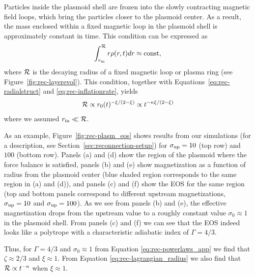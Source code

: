 Particles inside the plasmoid shell are frozen into the slowly contracting magnetic field loops, which bring the particles closer to the plasmoid center. As a result, the mass enclosed within a fixed magnetic loop in the plasmoid shell is approximately constant in time. This condition can be expressed as
\begin{equation}
    \int_{r_{\rm in}}^{\mathcal{R}}r \rho(r, t)dr \approx \mathrm{const},
\end{equation}
where $\mathcal{R}$ is the decaying radius of a fixed magnetic loop or plasma ring (see Figure~\ref{fig:rec-layerevol}). 
This condition, together with Equations~\eqref{eq:rec-radialstruct} and \eqref{eq:rec-inflationrate}, yields
\begin{equation}
    \label{eq:rec-lagrangian_radius}
    \mathcal{R}\propto r_0(t)^{-\xi/(2-\xi)} \propto t^{-\kappa\xi/(2-\xi)}
\end{equation}
where we assumed $r_{\rm in} \ll \mathcal{R}$.

As an example, Figure~\ref{fig:rec-plasm_eos} shows results from our simulations (for a description, see Section~\ref{sec:reconnection-setup}) for $\sigma_{\rm up}=10$ (top row) and $100$ (bottom row). Panels (a) and (d) show the region of the plasmoid where the force balance is satisfied, panels (b) and (e) show magnetization as a function of radius from the plasmoid center (blue shaded region corresponds to the same region in (a) and (d)), and panels (c) and (f) show the EOS for the same region (top and bottom panels correspond to different upstream magnetizations, $\sigma_{\rm up}=10$ and $\sigma_{\rm up} = 100$). As we see from panels (b) and (e), the effective magnetization drops from the upstream value to a roughly constant value $\sigma_0\approx 1$ in the plasmoid shell. From panels (c) and (f) we can see that the EOS indeed looks like a polytrope with a characteristic adiabatic index of $\Gamma=4/3$. 

Thus, for $\Gamma=4/3$ and $\sigma_0\approx 1$ from Equation \eqref{eq:rec-powerlaws_app} we find that $\zeta\approx 2/3$ and $\xi \approx 1$. From Equation \eqref{eq:rec-lagrangian_radius} we also find that $\mathcal{R}\propto t^{-\kappa}$ when $\xi\approx 1$.

